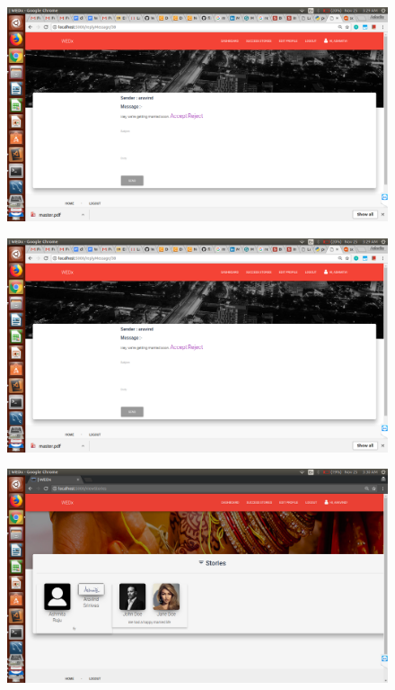 \documentclass[12pt]{report}
\begin{document}
\begin{figure}[!htb]
    \centering
    \includegraphics[width=1\textwidth]{sc-21.png}
\end{figure}

\begin{figure}[!htb]
    \centering
    \includegraphics[width=1\textwidth]{sc-22.png}
\end{figure}

\begin{figure}[!htb]
    \centering
    \includegraphics[width=1\textwidth]{sc-23.png}
\end{figure}
\end{document}
